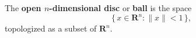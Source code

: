 The \textbf{open $n$-dimensional disc} or \textbf{ball} is the space
$$
\{\, x \in \mathbf{R}^n : \|x\| < 1 \,\},
$$
topologized as a subset of $\mathbf{R}^n$.
